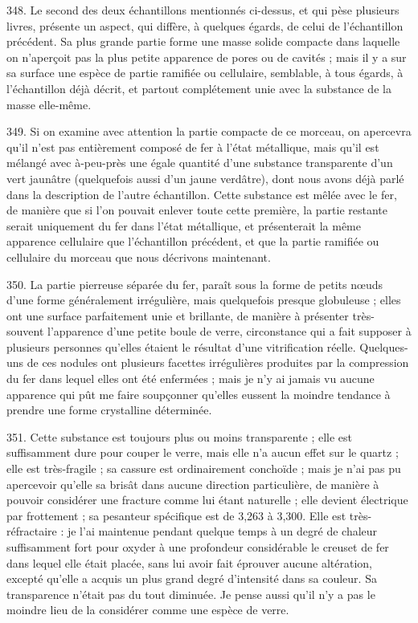 \documentclass[a4paper, 11pt, oneside, polutonikogreek, french]{article}
\begin{document}
348. Le second des deux échantillons mentionnés ci-dessus, et qui pèse plusieurs livres, présente un aspect, qui diffère, à quelques égards, de celui de l'échantillon précédent. Sa plus grande partie forme une masse solide compacte dans laquelle on n'aperçoit pas la plus petite apparence de pores ou de cavités ; mais il y a sur sa surface une espèce de partie ramifiée ou cellulaire, semblable, à tous égards, à l'échantillon déjà décrit, et partout complétement unie avec la substance de la masse elle-même.

349. Si on examine avec attention la partie compacte de ce morceau, on apercevra qu'il n'est pas entièrement composé de fer à l'état métallique, mais qu'il est mélangé avec à-peu-près une égale quantité d'une substance transparente d'un vert jaunâtre (quelquefois aussi d'un jaune verdâtre), dont nous avons déjà parlé dans la description de l'autre échantillon. Cette substance est mêlée avec le fer, de manière que si l'on pouvait enlever toute cette première, la partie restante serait uniquement du fer dans l'état métallique, et présenterait la même apparence cellulaire que l'échantillon précédent, et que la partie ramifiée ou cellulaire du morceau que nous décrivons maintenant.

350. La partie pierreuse séparée du fer, paraît sous la forme de petits nœuds d'une forme généralement irrégulière, mais quelquefois presque globuleuse ; elles ont une surface parfaitement unie et brillante, de manière à présenter très-souvent l'apparence d'une petite boule de verre, circonstance qui a fait supposer à plusieurs personnes qu'elles étaient le résultat d'une vitrification réelle. Quelques-uns de ces nodules ont plusieurs facettes irrégulières produites par la compression du fer dans lequel elles ont été enfermées ; mais je n'y ai jamais vu aucune apparence qui pût me faire soupçonner qu'elles eussent la moindre tendance à prendre une forme crystalline déterminée.

351. Cette substance est toujours plus ou moins transparente ; elle est suffisamment dure pour couper le verre, mais elle n'a aucun effet sur le quartz ; elle est très-fragile ; sa cassure est ordinairement conchoïde ; mais je n'ai pas pu apercevoir qu'elle sa brisât dans aucune direction particulière, de manière à pouvoir considérer une fracture comme lui étant naturelle ; elle devient électrique par frottement ; sa pesanteur spécifique est de 3,263 à 3,300. Elle est très-réfractaire : je l'ai maintenue pendant quelque temps à un degré de chaleur suffisamment fort pour oxyder à une profondeur considérable le creuset de fer dans lequel elle était placée, sans lui avoir fait éprouver aucune altération, excepté qu'elle a acquis un plus grand degré d'intensité dans sa couleur. Sa transparence n'était pas du tout diminuée. Je pense aussi qu'il n'y a pas le moindre lieu de la considérer comme une espèce de verre.
\end{document}
